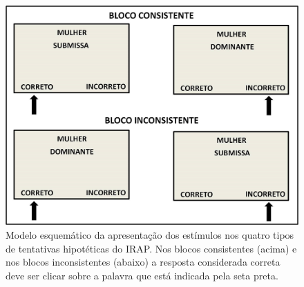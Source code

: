 \begin{figure}[t]
    \includegraphics[width=\linewidth]{5/figura2.jpg}
    \caption{Modelo esquemático da apresentação dos estímulos nos quatro tipos de tentativas hipotéticas do IRAP. Nos blocos consistentes (acima) e nos blocos inconsistentes (abaixo) a resposta considerada correta deve ser clicar sobre a palavra que está indicada pela seta preta.}
    \label{fig2}
\end{figure}

